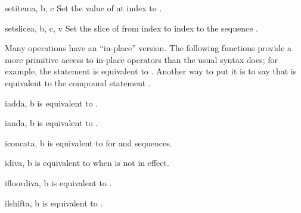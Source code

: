 \begin{funcdesc}{setitem}{a, b, c}
Set the value of  at index  to .
\end{funcdesc}

\begin{funcdesc}{setslice}{a, b, c, v}
Set the slice of  from index  to index  to the
sequence .
\end{funcdesc}


Many operations have an ``in-place'' version.  The following functions
provide a more primitive access to in-place operators than the usual
syntax does; for example, the statement  is equivalent to
.  Another way to put it is to say that
 is equivalent to the compound statement
.

\begin{funcdesc}{iadd}{a, b}
 is equivalent to .
\end{funcdesc}

\begin{funcdesc}{iand}{a, b}
 is equivalent to .
\end{funcdesc}

\begin{funcdesc}{iconcat}{a, b}
 is equivalent to  for 
and  sequences.
\end{funcdesc}

\begin{funcdesc}{idiv}{a, b}
 is equivalent to  when
 is not in effect.
\end{funcdesc}

\begin{funcdesc}{ifloordiv}{a, b}
 is equivalent to .
\end{funcdesc}

\begin{funcdesc}{ilshift}{a, b}
 is equivalent to .
\end{funcdesc}

